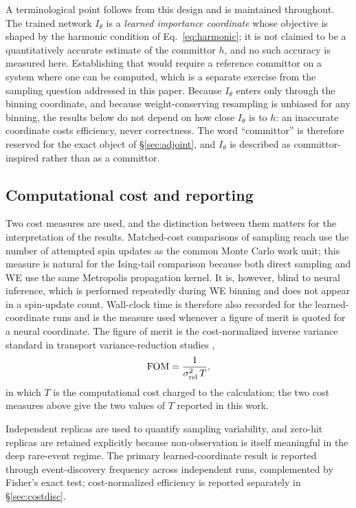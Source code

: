 \documentclass[a4paper,fleqn]{cas-sc}
\newcommand{\FOM}{\mathrm{FOM}}
\begin{document}
A terminological point follows from this design and is maintained throughout. The trained
network $I_\theta$ is a \emph{learned importance coordinate} whose objective is shaped by the
harmonic condition of Eq.~\eqref{eq:harmonic}; it is not claimed to be a quantitatively
accurate estimate of the committor $h$, and no such accuracy is measured here. Establishing
that would require a reference committor on a system where one can be computed, which is a
separate exercise from the sampling question addressed in this paper. Because $I_\theta$ enters
only through the binning coordinate, and because weight-conserving resampling is unbiased for
any binning, the results below do not depend on how close $I_\theta$ is to $h$: an inaccurate
coordinate costs efficiency, never correctness. The word ``committor'' is therefore reserved
for the exact object of \S\ref{sec:adjoint}, and $I_\theta$ is described as
committor-inspired rather than as a committor.

\subsection{Computational cost and reporting}\label{sec:cost}
Two cost measures are used, and the distinction between them matters for the interpretation
of the results. Matched-cost comparisons of sampling reach use the number of attempted spin
updates as the common Monte Carlo work unit; this measure is natural for the Ising-tail
comparison because both direct sampling and WE use the same Metropolis propagation kernel.
It is, however, blind to neural inference, which is performed repeatedly during WE binning
and does not appear in a spin-update count. Wall-clock time is therefore also recorded for
the learned-coordinate runs and is the measure used whenever a figure of merit is quoted for
a neural coordinate. The figure of merit is the cost-normalized inverse variance standard in
transport variance-reduction studies \citep{spanier1969,wagnerfw2014},
\begin{equation}
\FOM=\frac{1}{\sigma_{\rm rel}^{2}\,T},
\label{eq:fom}
\end{equation}
in which $T$ is the computational cost charged to the calculation; the two cost measures above
give the two values of $T$ reported in this work.

Independent replicas are used to quantify sampling variability, and zero-hit replicas are
retained explicitly because non-observation is itself meaningful in the deep rare-event
regime. The primary learned-coordinate result is reported through event-discovery frequency
across independent runs, complemented by Fisher's exact test; cost-normalized efficiency is
reported separately in \S\ref{sec:costdisc}.
\end{document}
